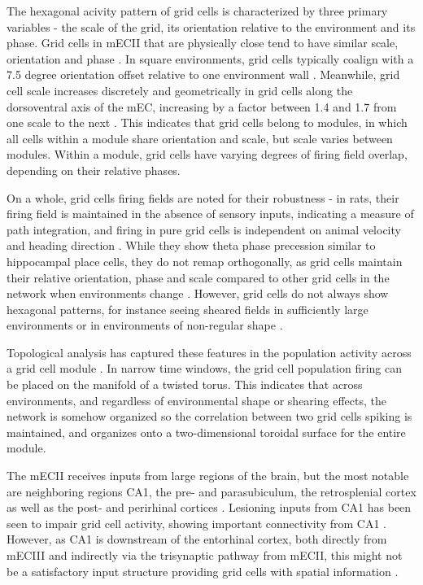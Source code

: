 \documentclass{article}
\begin{document}
    The hexagonal acivity pattern of grid cells is characterized by three primary variables - the scale of the grid, its orientation relative to the environment and its phase. Grid cells in mECII that are physically close tend to have similar scale, orientation and phase \parencite{Hafting2005}. In square environments, grid cells typically coalign with a 7.5 degree orientation offset relative to one environment wall \parencite{Stensola2015}. Meanwhile, grid cell scale increases discretely and geometrically in grid cells along the dorsoventral axis of the mEC, increasing by a factor between 1.4 and 1.7 from one scale to the next \parencite{Stensola2012}. This indicates that grid cells belong to modules, in which all cells within a module share orientation and scale, but scale varies between modules. Within a module, grid cells have varying degrees of firing field overlap, depending on their relative phases.

    On a whole, grid cells firing fields are noted for their robustness - in rats, their firing field is maintained in the absence of sensory inputs, indicating a measure of path integration, and firing in pure grid cells is independent on animal velocity and heading direction \parencite{Hafting2005}. While they show theta phase precession similar to hippocampal place cells, they do not remap orthogonally, as grid cells maintain their relative orientation, phase and scale compared to other grid cells in the network when environments change \parencite{Hafting2008, Fyhn2007}. However, grid cells do not always show hexagonal patterns, for instance seeing sheared fields in sufficiently large environments or in environments of non-regular shape \parencite{Stensola2015,Krupic2015}.

    Topological analysis has captured these features in the population activity across a grid cell module \parencite{Gardner2022}. In narrow time windows, the grid cell population firing can be placed on the manifold of a twisted torus. This indicates that across environments, and regardless of environmental shape or shearing effects, the network is somehow organized so the correlation between two grid cells spiking is maintained, and organizes onto a two-dimensional toroidal surface for the entire module.

    The mECII receives inputs from large regions of the brain, but the most notable are neighboring regions CA1, the pre- and parasubiculum, the retrosplenial cortex as well as the post- and perirhinal cortices \parencite{Kerr2007}. Lesioning inputs from CA1 has been seen to impair grid cell activity, showing important connectivity from CA1 \parencite{Bonnevie2013}. However, as CA1 is downstream of the entorhinal cortex, both directly from mECIII and indirectly via the trisynaptic pathway from mECII, this might not be a satisfactory input structure providing grid cells with spatial information \parencite{Tamamaki1993,Kerr2007,Witter2017}.
\end{document}
